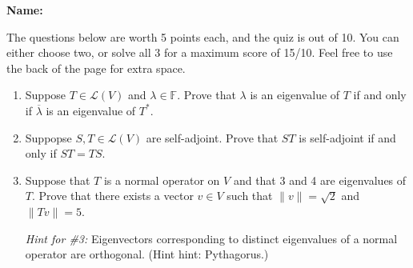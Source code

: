 \documentclass[12pt]{article}
\newcommand{\len}[1]{\lVert #1\rVert}
\begin{document}
\thispagestyle{fancy}
{\bf Name:}

\bigskip

The questions below are worth 5 points each, and the quiz is out of 10. You can either choose two, or solve all 3 for a maximum score of 15/10. Feel free to use the back of the page for extra space.

\begin{enumerate}
 \item Suppose $T\in\mathcal{L}(V)$ and $\lambda\in\mathbb{F}$. Prove that $\lambda$ is an eigenvalue of $T$ if and only if $\overline{\lambda}$ is an eigenvalue of $T^*$.
 \item Suppopse $S,T\in\mathcal{L}(V)$ are self-adjoint. Prove that $ST$ is self-adjoint if and only if $ST=TS$.
 \item Suppose that $T$ is a normal operator on $V$ and that 3 and 4 are eigenvalues of $T$. Prove that there exists a vector $v\in V$ such that $\len{v}=\sqrt{2}$ and $\len{Tv} = 5$.

{\em Hint for \#3:} Eigenvectors corresponding to distinct eigenvalues of a normal operator are orthogonal. (Hint hint: Pythagorus.)
\end{enumerate}
\end{document}
